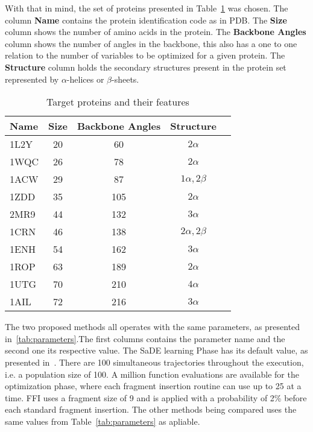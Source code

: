 With that in mind, the set of proteins presented in Table~\ref{tab:protein-targets}
was chosen. The column \textbf{Name} contains the protein identification code
as in PDB.  The \textbf{Size} column shows the number of amino acids in the protein.
The \textbf{Backbone Angles} column shows the number of angles in the backbone,
this also has a one to one relation to the number of variables to be optimized
for a given protein. The \textbf{Structure} column holds the secondary
structures present in the protein set represented by $\alpha$-helices or
$\beta$-sheets.

\begin{table}[bh]
  \centering
  \begin{tabular}{ l | c | c | c | c }
    \hline \hline
    Name & Size & Backbone Angles & Structure         \\ \hline \hline
    1L2Y & 20   & 60              & $2\alpha$         \\ \hline
    1WQC & 26   & 78              & $2\alpha$         \\ \hline
    1ACW & 29   & 87              & $1\alpha, 2\beta$ \\ \hline
    1ZDD & 35   & 105             & $2\alpha$         \\ \hline
    2MR9 & 44   & 132             & $3\alpha$         \\ \hline
    1CRN & 46   & 138             & $2\alpha, 2\beta$ \\ \hline
    1ENH & 54   & 162             & $3\alpha$         \\ \hline
    1ROP & 63   & 189             & $2\alpha$         \\ \hline
    1UTG & 70   & 210             & $4\alpha$         \\ \hline
    1AIL & 72   & 216             & $3\alpha$         \\ \hline
    \hline
  \end{tabular}
  \caption{Target proteins and their features}
  \label{tab:protein-targets}
\end{table}



The two proposed methods all operates with the same parameters, as presented
in~\ref{tab:parameters}.The first columns contains the parameter name and the
second one its respective value. The SaDE learning Phase has its default value,
as presented in~\cite{qin2009differential}. There are 100 simultaneous
trajectories throughout the execution, i.e. a population size of 100. A million
function evaluations are available for the optimization phase, where each
fragment insertion routine can use up to 25 at a time. \ac{FFI} uses a fragment
size of 9 and is applied with a probability of 2\% before each standard fragment
insertion. The other methods being compared uses the same values from
Table~\ref{tab:parameters} as apliable.

